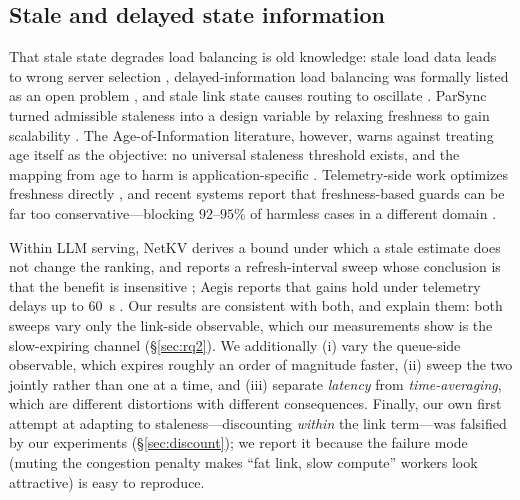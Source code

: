 \subsection{Stale and delayed state information}
That stale state degrades load balancing is old knowledge: stale load data leads to wrong server
selection \cite{staleloadold}, delayed-information load balancing was formally listed as an open
problem \cite{delayedopen}, and stale link state causes routing to oscillate
\cite{stalelinkqos}. ParSync turned admissible staleness into a design variable by relaxing
freshness to gain scalability \cite{parsync}. The Age-of-Information literature, however, warns
against treating age itself as the objective: no universal staleness threshold exists, and the
mapping from age to harm is application-specific \cite{aoisurvey,timelyremote}. Telemetry-side
work optimizes freshness directly \cite{freshint}, and recent systems report that
freshness-based guards can be far too conservative---blocking $92$--$95\%$ of harmless cases in a
different domain \cite{staleguard}.

Within LLM serving, NetKV derives a bound under which a stale estimate does not change the
ranking, and reports a refresh-interval sweep whose conclusion is that the benefit is
insensitive \cite{netkv}; Aegis reports that gains hold under telemetry delays up to
\SI{60}{\second} \cite{aegis}. Our results are consistent with both, and explain them: both
sweeps vary only the link-side observable, which our measurements show is the slow-expiring
channel (\S\ref{sec:rq2}). We additionally (i) vary the queue-side observable, which expires
roughly an order of magnitude faster, (ii) sweep the two jointly rather than one at a time, and
(iii) separate \emph{latency} from \emph{time-averaging}, which are different distortions with
different consequences. Finally, our own first attempt at adapting to staleness---discounting
\emph{within} the link term---was falsified by our experiments (\S\ref{sec:discount}); we report
it because the failure mode (muting the congestion penalty makes ``fat link, slow compute''
workers look attractive) is easy to reproduce.

